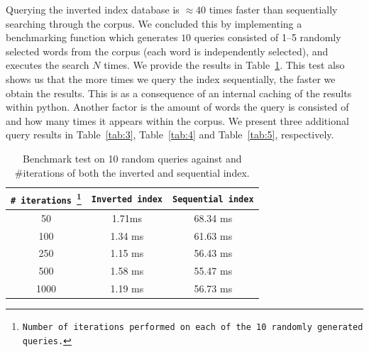 \documentclass{article}
\begin{document}
	Querying the inverted index database is $\approx40$ times faster than sequentially searching through the corpus. We concluded this by implementing a benchmarking function which generates $10$ queries consisted of \numrange{1}{5} randomly selected words from the corpus (each word is independently selected), and executes the search $N$ times. We provide the results in Table~\ref{tab:1}. This test also shows us that the more times we query the index sequentially, the faster we obtain the results. This is as a consequence of an internal caching of the results within python. Another factor is the amount of words the query is consisted of and how many times it appears within the corpus. We present three additional query results in Table~\ref{tab:3}, Table~\ref{tab:4} and Table~\ref{tab:5}, respectively.
	
	\begin{table}[hbt!]
		\centering
		\begin{tabular}{c|c|c}
			\texttt{\# iterations \footnote{Number of iterations performed on each of the 10 randomly generated queries.}}& \texttt{Inverted index} & \texttt{Sequential index}  \\ \hline
			50 & 1.71ms  & 68.34 ms \\
			100 & 1.34 ms & 61.63 ms \\
			250 & 1.15 ms & 56.43 ms \\
			500 & 1.58 ms & 55.47 ms \\
			1000 & 1.19 ms & 56.73 ms
		\end{tabular}
		\caption{Benchmark test on 10 random queries against and \#iterations of both the inverted and sequential index.}
		\label{tab:1}
	\end{table}
	
\end{document}
